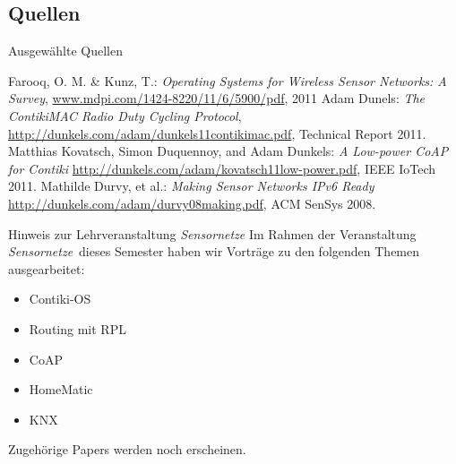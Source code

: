 \subsection{Quellen}
\begin{frame}{Ausgewählte Quellen}{}
	\begin{thebibliography}{contiki12}
		Farooq, O. M. \& Kunz, T.:
		\emph{Operating Systems for Wireless Sensor Networks: A Survey},
		\url{www.mdpi.com/1424-8220/11/6/5900/pdf},
		2011
		Adam Dunels:
		\emph{The ContikiMAC Radio Duty Cycling Protocol},
		\url{http://dunkels.com/adam/dunkels11contikimac.pdf},
		Technical Report 2011.
		Matthias Kovatsch, Simon Duquennoy, and Adam Dunkels:
		\emph{A Low-power CoAP for Contiki}
		\url{http://dunkels.com/adam/kovatsch11low-power.pdf},
		IEEE IoTech 2011.
		Mathilde Durvy, et al.:
		\emph{Making Sensor Networks IPv6 Ready}
		\url{http://dunkels.com/adam/durvy08making.pdf},
		ACM SenSys 2008.
	\end{thebibliography}
\end{frame}
\begin{frame}{Hinweis zur Lehrveranstaltung \emph{Sensornetze}}{}
	Im Rahmen der Veranstaltung \emph{Sensornetze}\, dieses Semester haben wir
	Vorträge zu den folgenden Themen ausgearbeitet:
	\begin{itemize}
		\item 	Contiki-OS
		\item 	Routing mit RPL
		\item 	CoAP
		\item 	HomeMatic
		\item 	KNX
	\end{itemize}
	\vspace{1em}
	Zugehörige Papers werden noch erscheinen.
\end{frame}
